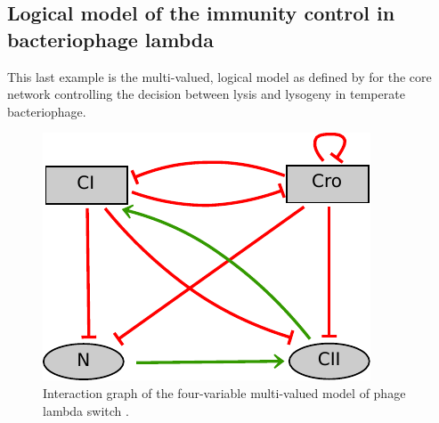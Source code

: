 \bigskip




\bigskip
\subsection{Logical model of the immunity control in bacteriophage lambda}
\label{sub:ex_phage}
This last example is the multi-valued, logical model as defined by \citet{thieffry95} for the core network controlling the decision between lysis and lysogeny in temperate bacteriophage. 

\begin{figure}[hb]
  \includegraphics{figs/phage_lambda.pdf}
  \caption{Interaction graph of the four-variable multi-valued model of phage lambda switch \citep{thieffry95}.}
  \label{ex-phage}
\end{figure}






